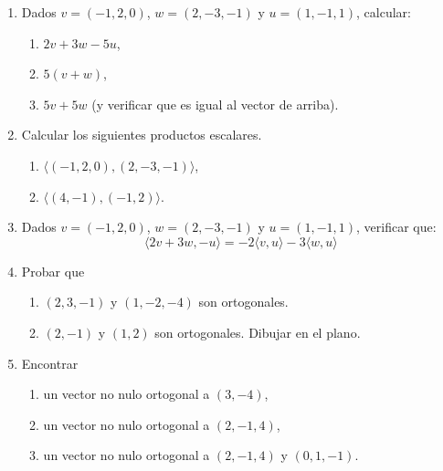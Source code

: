 \begin{enumerate}[topsep=6pt, itemsep=.4cm]


\item Dados $v = (-1, 2, 0)$, $w = (2,-3,-1)$ y $u = (1,-1,1)$, calcular:
\begin{enumerate}
    \item $2v + 3w -5u$,
    \item $5(v+w)$,
    \item $5v + 5w$ (y verificar que es igual al vector de arriba).
\end{enumerate}

\item Calcular los siguientes productos escalares. %
\begin{enumerate}
  \item $\langle (-1, 2, 0) ,(2,-3,-1) \rangle$,
  \item  $\langle (4,-1),(-1,2) \rangle$.
\end{enumerate}


\item Dados $v = (-1, 2, 0)$, $w = (2,-3,-1)$  y $u = (1,-1,1)$, verificar que:
\begin{equation*}
    \langle 2v + 3w , -u   \rangle = -2\langle v ,u \rangle -3 \langle w , u  \rangle
\end{equation*}


\item Probar  que
\begin{enumerate}
    \item $(2,3,-1)$ y $(1, -2, -4)$ son ortogonales.
    \item $(2,-1)$ y $(1,2)$ son ortogonales. Dibujar en el plano.
\end{enumerate}

\item Encontrar
\begin{enumerate}
    \item un vector no nulo ortogonal  a $(3,-4)$,
    \item un vector no nulo ortogonal a $(2,-1,4)$,
    \item un vector no nulo ortogonal a $(2,-1,4)$ y $(0,1,-1)$.
\end{enumerate}





\end{enumerate}

